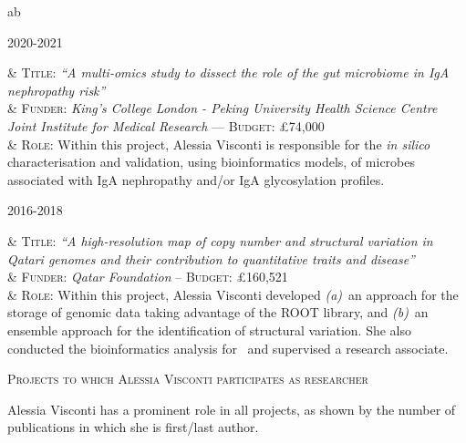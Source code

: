 \documentclass[a4paper,10pt]{article}
\newcommand{\smalltitle}[1]{
	\vspace{0.1cm}
	{\noindent 
	\large \textsc{#1}}
	\vspace{0.1cm}
}
\newenvironment{singletablelist}
{	\vspace{-0.2cm}
	\begin{longtable}[!h]{ab}}{\end{longtable}
}
\newcommand{\stlist}[2]{
	\hspace{-3cm}
	\noindent
	\begin{minipage}{0.24\textwidth}
	\begin{flushright}
	\textsc{#1}
	\end{flushright}
	\end{minipage}
	& #2\\[0.2cm]
}
\begin{document}
\begin{singletablelist}
	\stlist{2020-2021}{ 
		  \textsc{Title:} \emph{``A multi-omics study to dissect the role of the gut microbiome in IgA nephropathy risk''}\\
		& \textsc{Funder:} \emph{King's College London - Peking University Health Science Centre Joint Institute for Medical Research} --- \textsc{Budget:} £74,000\\
		& \textsc{Role:}  Within this project, Alessia Visconti is responsible for the \emph{in silico} characterisation and validation, using bioinformatics models, of microbes associated with IgA nephropathy and/or IgA glycosylation profiles.
	}
		
	\stlist{2016-2018}{ 
		  \textsc{Title:} \emph{``A high-resolution map of copy number and structural variation in Qatari genomes and their contribution to quantitative traits and disease''}\\
		& \textsc{Funder:} \emph{Qatar Foundation} -- \textsc{Budget:} £160,521\\
		& \textsc{Role:} Within this project, Alessia Visconti developed \emph{(a)}~an approach for the storage of genomic data taking advantage of the ROOT library, and \emph{(b)}~an ensemble approach for the identification of structural variation. She also conducted the bioinformatics analysis for~\cite{Ros21} and supervised a research associate.
	}
		
\end{singletablelist}


\smalltitle{Projects to which Alessia Visconti participates as researcher}

\noindent  Alessia Visconti has a prominent role in all projects, as shown by the number of publications in which she is first/last author.

\vspace{0.1cm}
\end{document}
